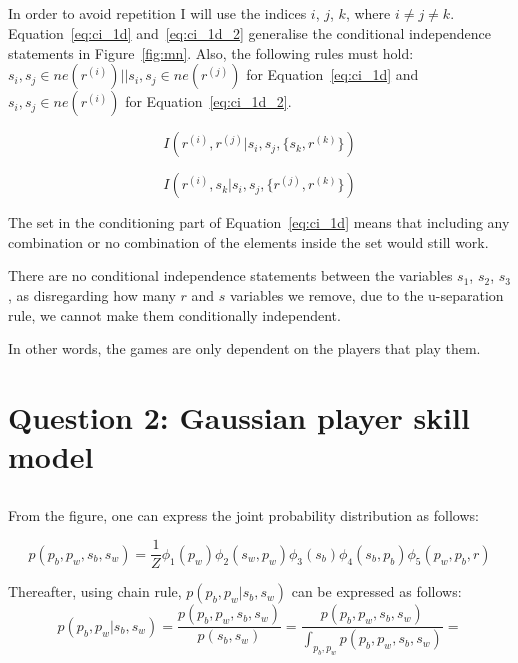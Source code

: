 \documentclass[a4paper,11pt]{article}
\theoremstyle{mytheor}
\begin{document}
\subsection{}
\label{sec:1d}

In order to avoid repetition I will use the indices $i$, $j$, $k$, where $i \neq j \neq k$. Equation~\ref{eq:ci_1d} and~\ref{eq:ci_1d_2} generalise the conditional independence statements in Figure~\ref{fig:mn}. Also, the following rules must hold: $s_i, s_j \in ne(r^{(i)}) || s_i, s_j \in ne(r^{(j)})$ for Equation~\ref{eq:ci_1d} and $s_i, s_j \in ne(r^{(i)})$ for Equation~\ref{eq:ci_1d_2}.

\begin{equation}
    \label{eq:ci_1d}
    I(r^{(i)}, r^{(j)} |s_i,s_j,\{s_k, r^{(k)}\})
\end{equation}

\begin{equation}
    \label{eq:ci_1d_2}
    I(r^{(i)}, s_k | s_i,s_j,\{r^{(j)}, r^{(k)}\})
\end{equation}

The set in the conditioning part of Equation~\ref{eq:ci_1d} means that including any combination or no combination of the elements inside the set would still work.

There are no conditional independence statements between the variables $s_1$, $s_2$, $s_3$, as disregarding how many $r$ and $s$ variables we remove, due to the u-separation rule, we cannot make them conditionally independent.

In other words, the games are only dependent on the players that play them.

\section{Question 2: Gaussian player skill model}
\label{sec:2}
\subsection{}
From the figure, one can express the joint probability distribution as follows:

\begin{equation}
    \label{eq:joint_distr}
    p(p_b,p_w,s_b,s_w) = \frac{1}{Z}\phi_{1}(p_w)\phi_{2}(s_w,p_w)\phi_{3}(s_b)\phi_{4}(s_b,p_b)\phi_{5}(p_w,p_b,r)
\end{equation}

Thereafter, using chain rule, $p(p_b,p_w|s_b,s_w)$ can be expressed as follows:
\begin{equation}
    \label{eq:chain_rule}
    p(p_b,p_w|s_b,s_w) = \frac{p(p_b,p_w,s_b,s_w)}{p(s_b,s_w)} = \frac{p(p_b,p_w,s_b,s_w)}{\int_{p_b,p_w} p(p_b,p_w,s_b,s_w)}= 
\end{equation}
\end{document}
